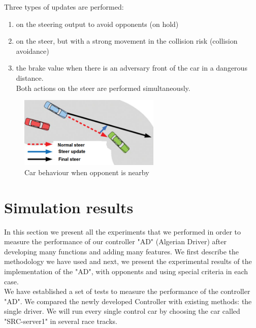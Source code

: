 \documentclass{llncs}
\begin{document}
Three types of updates are performed:
\begin{enumerate}
	
	\item on the steering output to avoid opponents (on hold)
	\item on the steer, but with a strong movement in the collision risk  (collision avoidance)
	\item the brake value when there is an adversary
	front of the car in a dangerous distance. \\
	Both actions on the steer are performed simultaneously.
	
\end{enumerate}
\begin{figure}[h!]
	
	\centering
	\includegraphics[width=0.6\textwidth]{fig/op.PNG}
	\begin{minipage}{10cm}
		\centering
		\caption{\footnotesize Car behaviour when opponent is nearby} 
		\label{fig42}
	\end{minipage} 
	
\end{figure}

\section{Simulation results}

In this section we present all the experiments that we performed in order to measure the performance of our controller "AD" (Algerian Driver) after developing many functions and adding many features.
We first describe the methodology we have used and next, we present the experimental results of the implementation of the "AD", with opponents and
using special criteria in each case. \\


We have established a set of tests to measure the performance of the controller "AD". We compared the newly developed Controller with existing methods: the single driver. We will run every single control car by choosing the car called "SRC-server1" in several race tracks. \\
\end{document}
